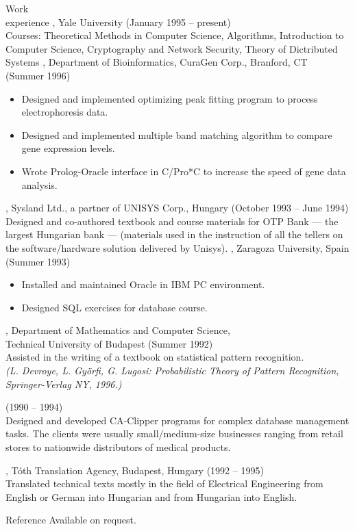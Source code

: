 \documentclass{resume}
\def\tub{Technical University of Budapest}
\def\TUB {\tub}
\begin{document}
\begin{category}{Work \\experience}
, Yale University (January 1995 -- present)\\ 
Courses: Theoretical Methods in Computer Science, Algorithms, 
Introduction to Computer Science, Cryptography and Network Security, 
Theory of Dictributed Systems
, Department of Bioinformatics, 
CuraGen Corp., Branford, CT\\ (Summer 1996)
\begin{itemize} 
\item Designed and implemented optimizing peak fitting program 
to process electrophoresis data.
\item Designed and implemented multiple band matching algorithm 
to compare gene expression levels.
\item Wrote Prolog-Oracle interface in C/Pro*C to increase the speed of
gene data analysis.
\end{itemize}

, Sysland Ltd., 
a partner of UNISYS Corp., Hungary (October 1993 -- June 1994)\\
Designed and co-authored textbook and course materials for OTP Bank 
--- the largest Hungarian bank ---
(materials used in the instruction of all the tellers on the
software/hardware solution delivered by Unisys).
, Zaragoza University, Spain (Summer 1993)
\begin{itemize}
\item Installed and maintained Oracle in IBM PC environment.
\item Designed SQL exercises for database course.
\end{itemize}

, Department of Mathematics and Computer Science,\\
{\TUB} (Summer 1992)\\
Assisted in the writing of a textbook on statistical pattern recognition.\\
{\em(L. Devroye, L. Gy\"orfi, G. Lugosi: Probabilistic Theory of Pattern
Recognition, Springer-Verlag NY, 1996.)}

 (1990 -- 1994)\\ 
Designed and developed CA-Clipper 
programs for complex database management tasks. The clients were
usually small/medium-size businesses ranging from retail stores to nationwide
distributors of medical products.

, T\'oth Translation Agency, Budapest, Hungary 
(1992 -- 1995)\\
Translated technical texts mostly in the field of Electrical Engineering from 
English or German into Hungarian and from Hungarian into English.
\end{category}


\begin{category}{Reference} 
\citemnobullet Available on request.
\end{category}
\end{document}
